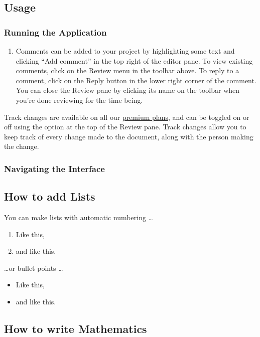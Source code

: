 \documentclass{article}
\begin{document}
\subsection{Usage}

\subsubsection{Running the Application}

\begin{enumerate}
    \item Comments can be added to your project by highlighting some text and clicking ``Add comment'' in the top right of the editor pane. To view existing comments, click on the Review menu in the toolbar above. To reply to a comment, click on the Reply button in the lower right corner of the comment. You can close the Review pane by clicking its name on the toolbar when you're done reviewing for the time being.
\end{enumerate}

Track changes are available on all our \href{https://www.overleaf.com/user/subscription/plans}{premium plans}, and can be toggled on or off using the option at the top of the Review pane. Track changes allow you to keep track of every change made to the document, along with the person making the change. 

\subsubsection{Navigating the Interface}


\subsection{How to add Lists}

You can make lists with automatic numbering \dots

\begin{enumerate}
\item Like this,
\item and like this.
\end{enumerate}
\dots or bullet points \dots
\begin{itemize}
\item Like this,
\item and like this.
\end{itemize}

\subsection{How to write Mathematics}
\end{document}
